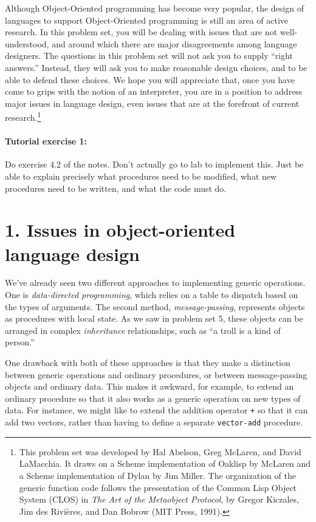 Although Object-Oriented programming has become very popular, the
design of languages to support Object-Oriented programming is still an
area of active research.  In this problem set, you will be dealing
with issues that are not well-understood, and around which there are
major disagreements among language designers.  The questions in this
problem set will not ask you to supply ``right answers.''  Instead,
they will ask you to make reasonable design choices, and to be able to
defend these choices.  We hope you will appreciate that, once you have
come to grips with the notion of an interpreter, you are in a position
to address major issues in language design, even issues that are at
the forefront of current research.\footnote{This problem set was
developed by Hal Abelson, Greg McLaren, and David LaMacchia.  It draws
on a Scheme implementation of Oaklisp by McLaren and a Scheme
implementation of Dylan by Jim Miller.  The organization of the
generic function code follows the presentation of the Common Lisp
Object System (CLOS) in {\em The Art of the Metaobject Protocol}, by
Gregor Kiczales, Jim des Rivi\`eres, and Dan Bobrow (MIT Press,
1991).}


\paragraph{Tutorial exercise 1:} Do exercise 4.2 of the notes.  Don't
actually go to lab to implement this.  Just be able to explain
precisely what procedures need to be modified, what new procedures
need to be written, and what the code must do.

\section{1. Issues in object-oriented language design}

We've already seen two different approaches to implementing generic
operations.  One is {\it data-directed programming}, which relies on a
table to dispatch based on the types of arguments.  The second method,
{\it message-passing}, represents objects as procedures with local
state.  As we saw in problem set 5, these objects can be arranged in
complex {\it inheritance} relationships, such as ``a troll is a kind
of person.''

One drawback with both of these approaches is that they make a
distinction between generic operations and ordinary procedures, or
between message-passing objects and ordinary data.  This makes it
awkward, for example, to extend an ordinary procedure so that it also
works as a generic operation on new types of data.  For instance, we
might like to extend the addition operator {\tt +} so that it can add
two vectors, rather than having to define a separate {\tt vector-add}
procedure.


